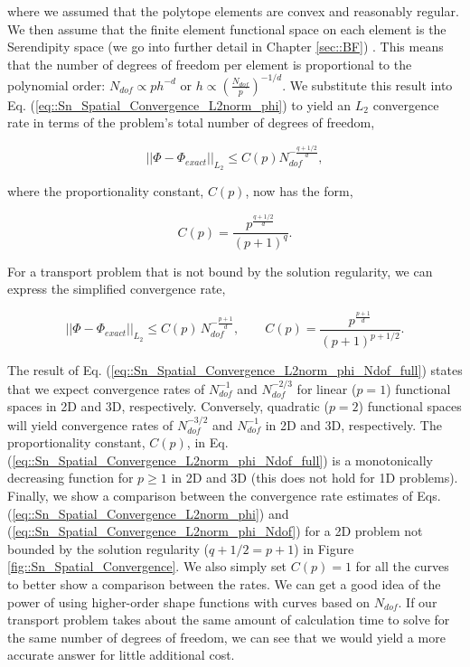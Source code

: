 \noindent where we assumed that the polytope elements are convex and reasonably regular. We then assume that the finite element functional space on each element is the Serendipity space (we go into further detail in Chapter \ref{sec::BF}) \cite{macneal1992eight,arnold2011serendipity}. This means that the number of degrees of freedom per element is proportional to the polynomial order: $N_{dof} \propto p h^{-d}$ or $h \propto \left(  \frac{N_{dof}}{p} \right)^{-1/d}$. We substitute this result into Eq. (\ref{eq::Sn_Spatial_Convergence_L2norm_phi}) to yield an $L_2$ convergence rate in terms of the problem's total number of degrees of freedom,

\begin{equation}
\label{eq::Sn_Spatial_Convergence_L2norm_phi_Ndof}
|| \Phi - \Phi_{exact} ||_{L_2} \leq C (p) N_{dof}^{-\frac{q+1/2}{d}},
\end{equation}

\noindent where the proportionality constant, $C(p)$, now has the form,

\begin{equation}
\label{eq::Sn_Spatial_Convergence_Cconstant}
C(p) =  \frac{p^{\frac{q+1/2}{d}}}{(p+1)^q}.
\end{equation}

\noindent For a transport problem that is not bound by the solution regularity, we can express the simplified convergence rate,

\begin{equation}
\label{eq::Sn_Spatial_Convergence_L2norm_phi_Ndof_full}
|| \Phi - \Phi_{exact} ||_{L_2} \leq C(p) \, N_{dof}^{-\frac{p+1}{d}}, \qquad C(p) = \frac{p^{\frac{p+1}{d}}}{(p+1)^{p+1/2}}.
\end{equation}

\noindent The result of Eq. (\ref{eq::Sn_Spatial_Convergence_L2norm_phi_Ndof_full}) states that we expect convergence rates of $N_{dof}^{-1}$ and $N_{dof}^{-2/3}$ for linear ($p=1$) functional spaces in 2D and 3D, respectively. Conversely, quadratic ($p=2$) functional spaces will yield convergence rates of $N_{dof}^{-3/2}$ and $N_{dof}^{-1}$ in 2D and 3D, respectively. The proportionality constant, $C(p)$, in Eq. (\ref{eq::Sn_Spatial_Convergence_L2norm_phi_Ndof_full}) is a monotonically decreasing function for $p \geq 1$ in 2D and 3D (this does not hold for 1D problems). Finally, we show a comparison between the convergence rate estimates of Eqs. (\ref{eq::Sn_Spatial_Convergence_L2norm_phi}) and (\ref{eq::Sn_Spatial_Convergence_L2norm_phi_Ndof}) for a 2D problem not bounded by the solution regularity ($q+1/2 = p+1$) in Figure \ref{fig::Sn_Spatial_Convergence}. We also simply set $C(p)=1$ for all the curves to better show a comparison between the rates. We can get a good idea of the power of using higher-order shape functions with curves based on $N_{dof}$. If our transport problem takes about the same amount of calculation time to solve for the same number of degrees of freedom, we can see that we would yield a more accurate answer for little additional cost.

